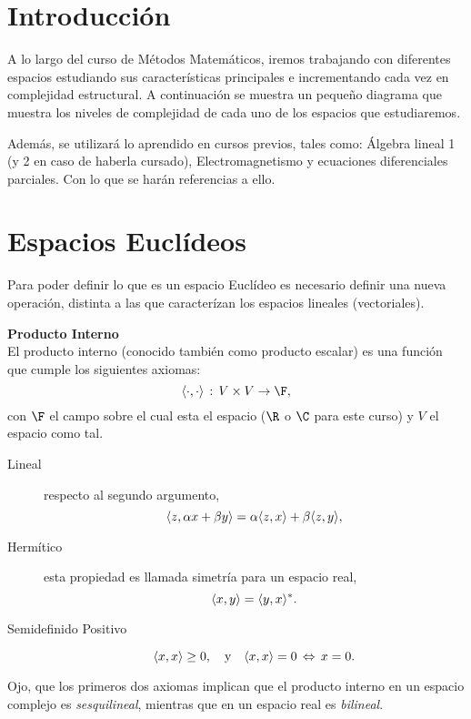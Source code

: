 \section*{Introducción}
A lo largo del curso de Métodos Matemáticos, iremos trabajando con diferentes espacios estudiando sus características principales e incrementando cada vez en complejidad estructural. A continuación se muestra un pequeño diagrama que muestra los niveles de complejidad de cada uno de los espacios que estudiaremos.

\begin{center}
	
\end{center}

Además, se utilizará lo aprendido en cursos previos, tales como: Álgebra lineal 1 (y 2 en caso de haberla cursado), Electromagnetismo y ecuaciones diferenciales parciales. Con lo que se harán referencias a ello. \\

\section*{Espacios Euclídeos}

Para poder definir lo que es un espacio Euclídeo es necesario definir una nueva operación, distinta a las que caracterízan los espacios lineales (vectoriales).

\begin{mdframed}[style=warning]
	{\large \textbf{Producto Interno}} \\
	El producto interno (conocido también como producto escalar) es una función que cumple los siguientes axiomas:
	\begin{equation}
		\langle \cdot , \cdot \rangle \, : \, V\times V \to \F , \nonumber
	\end{equation}
	con $\F$ el campo sobre el cual esta el espacio ($\R$ o $\C$ para este curso) y $V$ el espacio como tal.
	\begin{description}
		\item[Lineal] respecto al segundo argumento,
			$$ \langle z , \alpha x + \beta y \rangle = \alpha \langle z , x \rangle + \beta \langle z , y \rangle, $$	
		\item[Hermítico] esta propiedad es llamada simetría para un espacio real,
			$$ \langle x , y \rangle = \langle y , x \rangle ^*. $$
		\item[Semidefinido Positivo]
			$$ \langle x , x \rangle \geq 0, \quad \text{y} \quad \langle x , x \rangle = 0 \, \Leftrightarrow \, x = 0. $$
	\end{description}
	Ojo, que los primeros dos axiomas implican que el producto interno en un espacio complejo es \textit{sesquilineal}, mientras que en un espacio real es \textit{bilineal}.
\end{mdframed}

